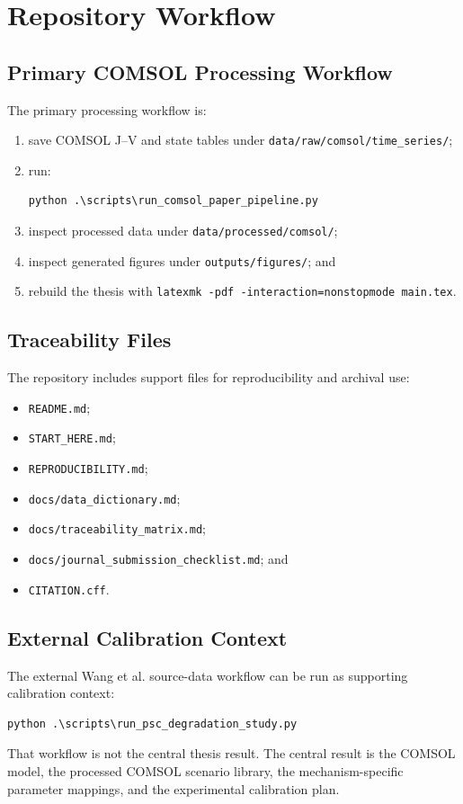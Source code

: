 \chapter{Repository Workflow}

\section{Primary COMSOL Processing Workflow}

The primary processing workflow is:
\begin{enumerate}
\item save COMSOL J--V and state tables under
\texttt{data/raw/comsol/time\_series/};
\item run:
\begin{verbatim}
python .\scripts\run_comsol_paper_pipeline.py
\end{verbatim}
\item inspect processed data under \texttt{data/processed/comsol/};
\item inspect generated figures under \texttt{outputs/figures/}; and
\item rebuild the thesis with
\texttt{latexmk -pdf -interaction=nonstopmode main.tex}.
\end{enumerate}

\section{Traceability Files}

The repository includes support files for reproducibility and archival use:
\begin{itemize}
\item \texttt{README.md};
\item \texttt{START\_HERE.md};
\item \texttt{REPRODUCIBILITY.md};
\item \texttt{docs/data\_dictionary.md};
\item \texttt{docs/traceability\_matrix.md};
\item \texttt{docs/journal\_submission\_checklist.md}; and
\item \texttt{CITATION.cff}.
\end{itemize}

\section{External Calibration Context}

The external Wang et al. source-data workflow can be run as supporting
calibration context:
\begin{verbatim}
python .\scripts\run_psc_degradation_study.py
\end{verbatim}
That workflow is not the central thesis result. The central result is the
COMSOL model, the processed COMSOL scenario library, the mechanism-specific
parameter mappings, and the experimental calibration plan.

